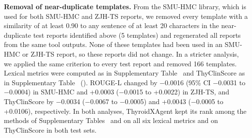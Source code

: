 \textbf{Removal of near-duplicate templates.} From the SMU-HMC library, which is used for both SMU-HMC and ZJH-TS reports, we removed every template with a similarity of at least 0.90 to any sentence of at least 20 characters in the near-duplicate test reports identified above (5 templates) and regenerated all reports from the same tool outputs. None of these templates had been used in an SMU-HMC or ZJH-TS report, so these reports did not change. In a stricter analysis, we applied the same criterion to every test report and removed 166 templates. Lexical metrics were computed as in Supplementary Table~\SuppTabNLG{} and ThyClinScore as in Supplementary Table~\SuppTabClinical{} (). ROUGE-L changed by $-$0.0016 (95\% CI $-$0.0031 to $-$0.0004) in SMU-HMC and +0.0003 ($-$0.0015 to +0.0022) in ZJH-TS, and ThyClinScore by $-$0.0034 ($-$0.0067 to $-$0.0005) and +0.0043 ($-$0.0005 to +0.0106), respectively. In both analyses, ThyroidXAgent kept its rank among the methods of Supplementary Tables~\SuppTabNLG{} and \SuppTabClinical{} on all six lexical metrics and on ThyClinScore in both test sets.\par

